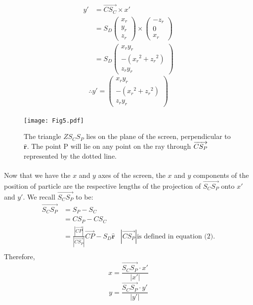 \documentclass{article}
\newcommand\xp{x\prime\xspace}
\newcommand\yp{y\prime\xspace}
\begin{document}
	\begin{align*}
		\yp & = \overrightarrow{C S_C} \times \xp \\
		     & = S_D  \begin{pmatrix}x_r\\y_r\\z_r\end{pmatrix} \times \begin{pmatrix} -z_r\\ 0\\ x_r \end{pmatrix} \\
		     & = S_D \begin{pmatrix} x_r y_r \\ -\left({x_r}^2 + {z_r}^2\right) \\ z_r y_r \end{pmatrix}
	\end{align*}
	\begin{equation}
		\therefore \yp = \begin{pmatrix} x_r y_r \\ -\left({x_r}^2 + {z_r}^2\right) \\ z_r y_r \end{pmatrix}
	\end{equation}
	\paragraph{}
	
	\begin{figure}
		\centering
		\texttt{[image: Fig5.pdf]}
		\caption{The triangle $Z S_C S_P$ lies on the plane of the screen, perpendicular to $\hat{\mathbf{r}}$. The point P will lie on any point on the ray through $\protect\overrightarrow{C S_P}$ represented by the dotted line.}
	\end{figure}	

	\paragraph{}	
	Now that we have the $x$ and $y$ axes of the screen, the $x$ and $y$ components of the position of particle are the respective lengths of the projection of $\overrightarrow{S_C S_P}$ onto $\xp$ and $\yp$. 
	We recall $\overrightarrow{S_C S_P}$ to be:
	\begin{align*}
		\overrightarrow{S_C S_P} & = S_P - S_C \\
		& = C S_P - C S_C \\
		& = \frac{\left|\overrightarrow{CP}\right|}{\left|\overrightarrow{C S_P}\right|} \overrightarrow{CP} - S_D \hat{\mathbf{r}} 
			& \left|\overrightarrow{C S_P}\right| \text{is defined in equation (2).} \\
	\end{align*}
	Therefore,
	$$x = \frac{\overrightarrow{S_C S_P} \cdot \xp}{\left|\xp\right|} $$
	$$y = \frac{\overrightarrow{S_C S_P} \cdot \yp}{\left|\yp\right|} $$
	
\end{document}
